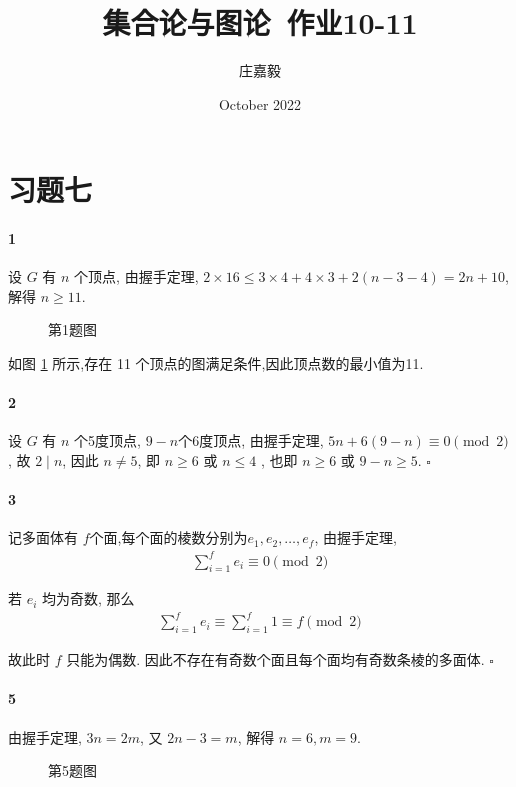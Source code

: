 \documentclass{ctexart}
\title{集合论与图论~作业10-11}
\author{庄嘉毅}
\date{October 2022}
\def\QED{\hfill $\square$}
\begin{document}
\maketitle

\section*{习题七}

\paragraph*{1} 设 $G$ 有 $n$ 个顶点, 由握手定理,
$2\times 16\le 3\times 4+4\times 3 + 2(n-3-4)=2n+10$,
解得 $n\ge 11$.

\begin{figure}[ht]
    \centering
    \caption{第1题图}
    \label{fig:1}
\end{figure}

如图 \ref{fig:1} 所示,存在 11 个顶点的图满足条件,因此顶点数的最小值为11.

\paragraph*{2} 设 $G$ 有 $n$ 个5度顶点, $9-n$个6度顶点, 由握手定理,
$5n+6(9-n)\equiv 0\pmod 2$, 故 $2\mid n$, 因此 $n\ne 5$,
即 $n\ge 6$ 或 $n\le 4$ , 也即 $n\ge 6$ 或 $9-n\ge 5$. \QED


\paragraph*{3} 记多面体有 $f$个面,每个面的棱数分别为$e_1,e_2,\ldots,e_f$,
由握手定理,
\begin{gather*}
    \sum_{i=1}^f e_i \equiv 0 \pmod 2
\end{gather*}

若 $e_i$ 均为奇数, 那么
\begin{gather*}
    \sum_{i=1}^f e_i \equiv \sum_{i=1}^f 1 \equiv f \pmod 2
\end{gather*}

故此时 $f$ 只能为偶数. 因此不存在有奇数个面且每个面均有奇数条棱的多面体. \QED

\paragraph*{5} 由握手定理, $3n=2m$, 又 $2n-3=m$, 解得 $n=6,m=9$.

\begin{figure}[ht]
    \centering
    \caption{第5题图}
    \label{fig:5}
\end{figure}

\end{document}
